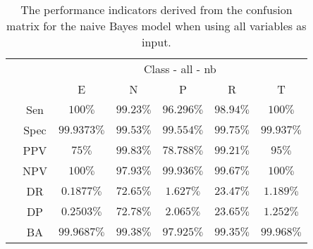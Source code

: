 \begin{table}[!ht]
	\centering
	\begin{tabular}{|c|c|c|c|c|c|c|}
		\cline{3-7}
		\multicolumn{2}{c|}{} & \multicolumn{5}{c|}{Class - all - nb} \\ \cline{3-7}
		\multicolumn{2}{c|}{} & E & N & P & R & T \\ \hline
		\multirow{7}{*}{\rotatebox{90}{Statistics}} & Sen & $100\%$ & $99.23\%$ & $96.296\%$ & $98.94\%$ & $100\%$ \\ \cline{2-7}
		 & Spec & $99.9373\%$ & $99.53\%$ & $99.554\%$ & $99.75\%$ & $99.937\%$ \\ \cline{2-7}
		 & PPV & $75\%$ & $99.83\%$ & $78.788\%$ & $99.21\%$ & $95\%$ \\ \cline{2-7}
		 & NPV & $100\%$ & $97.93\%$ & $99.936\%$ & $99.67\%$ & $100\%$ \\ \cline{2-7}
		 & DR & $0.1877\%$ & $72.65\%$ & $1.627\%$ & $23.47\%$ & $1.189\%$ \\ \cline{2-7}
		 & DP & $0.2503\%$ & $72.78\%$ & $2.065\%$ & $23.65\%$ & $1.252\%$ \\ \cline{2-7}
		 & BA & $99.9687\%$ & $99.38\%$ & $97.925\%$ & $99.35\%$ & $99.968\%$ \\ \hline
	\end{tabular}
	\caption{The performance indicators derived from the confusion matrix for the naive Bayes model when using all variables as input.}
	\label{tab:cs:reverse:all:nb}
\end{table}
